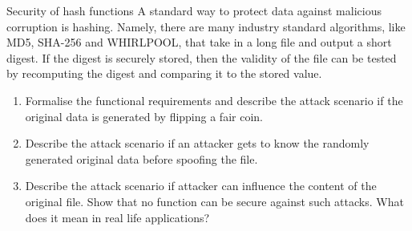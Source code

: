 \documentclass{crypto-exercise}
\begin{document}
\begin{exercise}{Security of hash functions}
  A standard way to protect data against malicious corruption is
  hashing. Namely, there are many industry standard algorithms, like
  MD5, SHA-256 and WHIRLPOOL, that take in a long file and output a
  short digest. If the digest is securely stored, then the validity of
  the file can be tested by recomputing the digest and comparing it to
  the stored value.
  \begin{enumerate}
  \item Formalise the functional requirements and describe the attack
    scenario if the original data is generated by flipping a fair coin.
  \item Describe the attack scenario if an attacker gets to know the
    randomly generated original data before spoofing the file. 
  \item Describe the attack scenario if attacker can influence the
    content of the original file. Show that no function can be secure
    against such attacks. What does it mean in real life applications?
  \end{enumerate}
\end{exercise}
\end{document}
